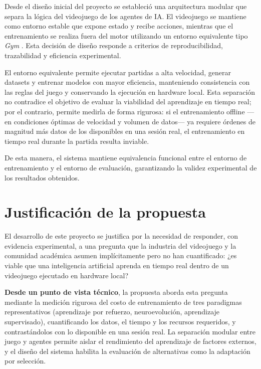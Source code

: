 Desde el diseño inicial del proyecto se estableció una arquitectura modular que separa la lógica del videojuego de los agentes de IA. El videojuego se mantiene como entorno estable que expone estado y recibe acciones, mientras que el entrenamiento se realiza fuera del motor utilizando un entorno equivalente tipo \textit{Gym} \cite{brockman2016openai}. Esta decisión de diseño responde a criterios de reproducibilidad, trazabilidad y eficiencia experimental.

El entorno equivalente permite ejecutar partidas a alta velocidad, generar datasets y entrenar modelos con mayor eficiencia, manteniendo consistencia con las reglas del juego y conservando la ejecución en hardware local. Esta separación no contradice el objetivo de evaluar la viabilidad del aprendizaje en tiempo real; por el contrario, permite medirla de forma rigurosa: si el entrenamiento offline ---en condiciones óptimas de velocidad y volumen de datos--- ya requiere órdenes de magnitud más datos de los disponibles en una sesión real, el entrenamiento en tiempo real durante la partida resulta inviable.

De esta manera, el sistema mantiene equivalencia funcional entre el entorno de entrenamiento y el entorno de evaluación, garantizando la validez experimental de los resultados obtenidos.

\section{Justificación de la propuesta}

El desarrollo de este proyecto se justifica por la necesidad de responder, con evidencia experimental, a una pregunta que la industria del videojuego y la comunidad académica asumen implícitamente pero no han cuantificado: ¿es viable que una inteligencia artificial aprenda en tiempo real dentro de un videojuego ejecutado en hardware local?

\textbf{Desde un punto de vista técnico}, la propuesta aborda esta pregunta mediante la medición rigurosa del costo de entrenamiento de tres paradigmas representativos (aprendizaje por refuerzo, neuroevolución, aprendizaje supervisado), cuantificando los datos, el tiempo y los recursos requeridos, y contrastándolos con lo disponible en una sesión real. La separación modular entre juego y agentes permite aislar el rendimiento del aprendizaje de factores externos, y el diseño del sistema habilita la evaluación de alternativas como la adaptación por selección.

